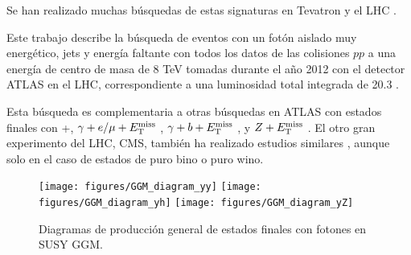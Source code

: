 

Se han realizado muchas búsquedas de estas signaturas en Tevatron
\cite{Abazov:2007ag,Buescher:2005he} y el LHC \cite{Aad:2012zza,
  Aad:2012jva,Aad:2011kz,Aad2012519,leptonphoton7,Chatrchyan:2011wc,
  Chatrchyan:2011ah,tagkey2015503}.

Este trabajo describe la búsqueda de eventos con un fotón aislado muy
energético, jets y energía faltante con todos los datos de las colisiones
$pp$ a una energía de centro de masa de 8 TeV tomadas durante el a\~no
2012 con el detector ATLAS en el LHC, correspondiente a una luminosidad
total integrada de 20.3 \ifb.

Esta búsqueda es complementaria a otras búsquedas en ATLAS con estados finales con
\gam\gam+\etmiss \cite{Aad2012519,ATLAS-CONF-2014-001}, $\gamma+e/\mu+E_{\mathrm{T}}^{\mathrm{miss}}$ \cite{ATLAS-CONF-2012-144},
$\gamma+b+E_{\mathrm{T}}^{\mathrm{miss}}$ \cite{Aad:2012jva}, y $Z+E_{\mathrm{T}}^{\mathrm{miss}}$ \cite{ATLAS-CONF-2012-152}. El otro gran experimento del
LHC, CMS, también ha realizado estudios similares \cite{CMS-PAS-SUS-12-018,CMS-PAS-SUS-14-004}, aunque solo
en el caso de estados de puro bino o puro wino. %

\begin{figure}[h!]
  \centering
  \texttt{[image: figures/GGM\_diagram\_yy]}
  \texttt{[image: figures/GGM\_diagram\_yh]}
  \texttt{[image: figures/GGM\_diagram\_yZ]}
  \caption{Diagramas de producción general de estados finales con
    fotones en SUSY GGM.}
  \label{fig:GGM_diagrams}
\end{figure}
